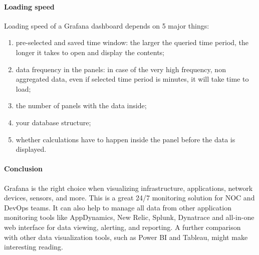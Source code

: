 \paragraph{Loading speed}
Loading speed of a Grafana dashboard depends on 5 major things:
\begin{enumerate}
    \item  pre-selected and saved time window: the larger the queried time period, the longer it takes to open and display the contents;
    \item  data frequency in the panels: in case of the very high frequency, non aggregated data, even if selected time period is minutes, it will take time to load;
    \item  the number of panels with the data inside;
    \item  your database structure;
    \item  whether calculations have to happen inside the panel before the data is displayed.
\end{enumerate}

\paragraph{Conclusion}
Grafana is the right choice when visualizing infrastructure, applications, network devices, sensors, and more. This is a great 24/7 monitoring solution for NOC and DevOps teams.
It can also help to manage all data from other application monitoring tools like AppDynamics, New Relic, Splunk, Dynatrace and all-in-one web interface for data viewing, alerting, and reporting.
A further comparison with other data visualization tools, such as Power BI and Tableau, might make interesting reading.



